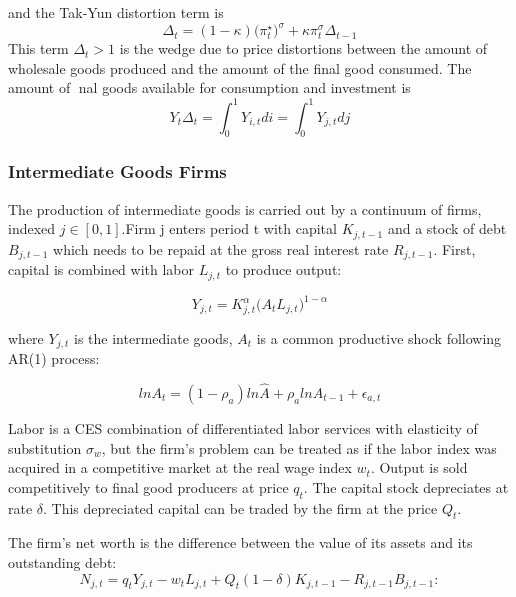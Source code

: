 \documentclass[cn,10pt,math=newtx,citestyle=gb7714-2015,bibstyle=gb7714-2015]{elegantbook}
\begin{document}
{{			and the Tak-Yun distortion term is
			\begin{equation}
				\Delta_t=(1-\kappa)\bigg(\pi_t^\star\bigg)^{\sigma}+\kappa \pi_t^\sigma \Delta_{t-1}
			\end{equation}
			This term $\Delta_t>1$ is the wedge due to price distortions between the amount of wholesale goods produced and the amount of the final good consumed. The amount of nal goods available for consumption and investment is
			\begin{equation}
				Y_t\Delta_t=\int_{0}^{1}Y_{i,t}di=\int_{0}^{1}Y_{j,t}dj
			\end{equation}
			
			
			\subsubsection{Intermediate Goods Firms}
			
			The production of intermediate goods is carried out by a continuum of firms, indexed $j \in [0, 1]$.Firm j enters period t with capital $K_{j,t-1}$ and a stock of debt $B_{j,t-1}$ which needs to be repaid at the gross real interest rate $R_{j,t-1}$. First, capital is combined with labor $L_{j,t}$ to produce output:
			
			\begin{equation}
				Y_{j,t}=K_{j,t}^{\alpha}\bigg(A_tL_{j,t}\bigg)^{1-\alpha}
			\end{equation}
			
			where $Y_{j,t}$ is the intermediate goods, $A_t$ is a common productive shock following AR(1) process:
			
			\begin{equation}
				lnA_t=(1-\rho_a)ln\hat{A}+\rho_a lnA_{t-1}+\epsilon_{a,t}
			\end{equation}
			
			Labor is a CES combination of differentiated labor services with elasticity of substitution $\sigma_w$, but the firm's problem can be treated as if the labor index was acquired in a competitive market at the real wage index $w_t$. Output is sold competitively to final good producers at price $q_t$. The capital stock depreciates at rate $\delta$. This depreciated capital can be traded by the firm at the price $Q_t$.
			
			The firm's net worth is the difference between the value of its assets and its outstanding debt:
			\begin{equation}
				N_{j,t} = q_tY_{j,t}-w_tL_{j,t} + Q_t (1 -\delta)K_{j,t-1} -R_{j,t-1}B_{j,t-1}:
			\end{equation}
			
}}
\end{document}
